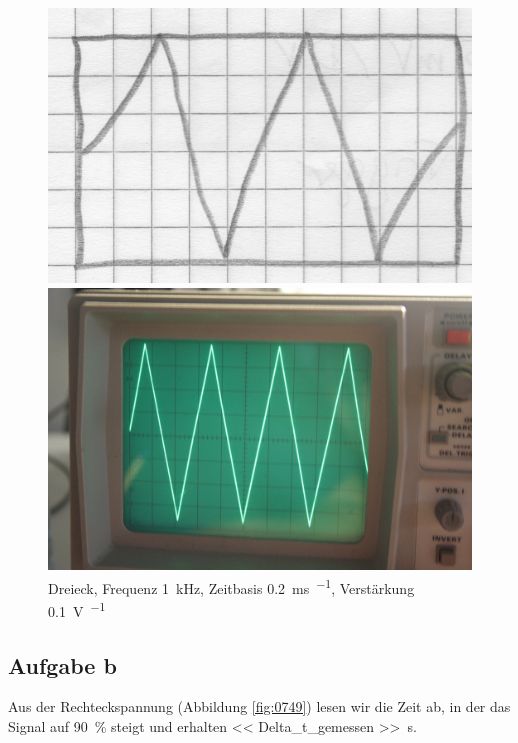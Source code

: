 \begin{figure}
	\centering
	\begin{minipage}{.45\linewidth}
	\includegraphics[width=\linewidth]{Skizzen/IMG_0746-1500.jpg}
	\end{minipage}
	\hfill
	\begin{minipage}{.45\linewidth}
	\includegraphics[width=\linewidth]{Fotos/IMG_0746-1500.jpg}
	\end{minipage}
	\caption{%
		Dreieck, Frequenz \SI{1}{\kilo\hertz}, Zeitbasis \SI{.2}{\milli\second\per\division}, Verstärkung \SI{.1}{\volt\per\division}
	}
	\label{fig:0746}
\end{figure}

\subsection{Aufgabe b}

Aus der Rechteckspannung (Abbildung \ref{fig:0749}) lesen wir die Zeit ab, in der das Signal auf \SI{90}{\percent} steigt und erhalten \SI{<< Delta_t_gemessen >>}{\second}.

